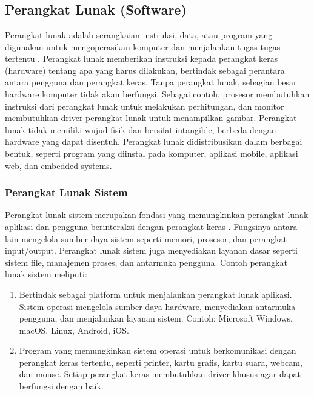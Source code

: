 \chapter{\babDua}

\section{Perangkat Lunak (\f{Software})}
Perangkat lunak adalah serangkaian instruksi, data, atau program yang digunakan untuk mengoperasikan komputer dan menjalankan tugas-tugas tertentu \cite{gee23}. Perangkat lunak memberikan instruksi kepada perangkat keras (hardware) tentang apa yang harus dilakukan, bertindak sebagai perantara antara pengguna dan perangkat keras. Tanpa perangkat lunak, sebagian besar hardware komputer tidak akan berfungsi. Sebagai contoh, prosesor membutuhkan instruksi dari perangkat lunak untuk melakukan perhitungan, dan monitor membutuhkan driver perangkat lunak untuk menampilkan gambar. Perangkat lunak tidak memiliki wujud fisik dan bersifat intangible, berbeda dengan hardware yang dapat disentuh. Perangkat lunak didistribusikan dalam berbagai bentuk, seperti program yang diinstal pada komputer, aplikasi mobile, aplikasi web, dan embedded systems.

\subsection{Perangkat Lunak Sistem}
Perangkat lunak sistem merupakan fondasi yang memungkinkan perangkat lunak aplikasi dan pengguna berinteraksi dengan perangkat keras \cite{gee23}. Fungsinya antara lain mengelola sumber daya sistem seperti memori, prosesor, dan perangkat input/output. Perangkat lunak sistem juga menyediakan layanan dasar seperti sistem file, manajemen proses, dan antarmuka pengguna. Contoh perangkat lunak sistem meliputi:

\begin{enumerate}
	\item {} Bertindak sebagai platform untuk menjalankan perangkat lunak aplikasi. Sistem operasi mengelola sumber daya hardware, menyediakan antarmuka pengguna, dan menjalankan layanan sistem. Contoh: Microsoft Windows, macOS, Linux, Android, iOS.

	\item {} Program yang memungkinkan sistem operasi untuk berkomunikasi dengan perangkat keras tertentu, seperti printer, kartu grafis, kartu suara, webcam, dan mouse. Setiap perangkat keras membutuhkan driver khusus agar dapat berfungsi dengan baik.

\end{enumerate}

